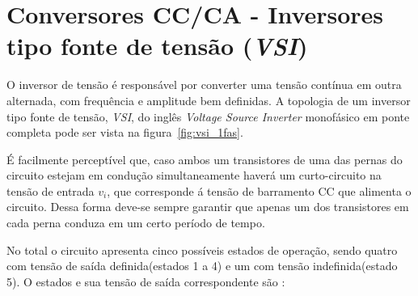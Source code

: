 \documentclass[
	12pt,				%
	openany,
	onseside,
	a4paper,			%
	english,			%
	french,				%
	spanish,			%
	brazil,				%
	]{abntex2}
\begin{document}
\section{Conversores CC/CA - Inversores tipo fonte de tensão (\textit{VSI})}




O inversor de tensão é responsável por converter uma tensão contínua em outra alternada, com frequência e amplitude bem definidas. A topologia de um inversor tipo fonte de tensão, \emph{VSI}, do inglês \textit{Voltage Source Inverter} monofásico em ponte completa pode ser vista na figura~\ref{fig:vsi_1fas}. 

É facilmente perceptível que, caso ambos um transistores de uma das pernas do circuito estejam em condução simultaneamente haverá um curto-circuito na tensão de entrada $v_i$, que corresponde á tensão de barramento CC que alimenta o circuito. Dessa forma deve-se sempre garantir que apenas um dos transistores em cada perna conduza em um certo período de tempo.

No total o circuito apresenta cinco possíveis estados de operação, sendo quatro com tensão de saída definida(estados 1 a 4) e um com tensão indefinida(estado 5). O estados e sua tensão de saída correspondente são \cite{RASHID_VSI}:
\end{document}
